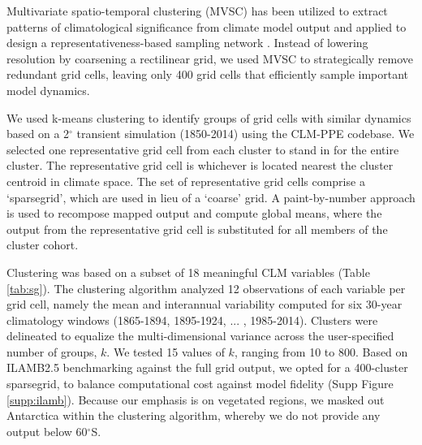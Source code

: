 \documentclass[draft]{agujournal2019}
\begin{document}
Multivariate spatio-temporal clustering (MVSC) has been utilized to extract patterns of climatological significance from climate model output \cite{hoffman2005} and applied to design a representativeness-based sampling network \cite{hoffman2013}. Instead of lowering resolution by coarsening a rectilinear grid, we used MVSC to strategically remove redundant grid cells, leaving only 400 grid cells that efficiently sample important model dynamics.

We used k-means clustering to identify groups of grid cells with similar dynamics based on a 2$^\circ$ transient simulation (1850-2014) using the CLM-PPE codebase. We selected one representative grid cell from each cluster to stand in for the entire cluster. The representative grid cell is whichever is located nearest the cluster centroid in climate space. The set of representative grid cells comprise a `sparsegrid', which are used in lieu of a `coarse' grid. A paint-by-number approach is used to recompose mapped output and compute global means, where the output from the representative grid cell is substituted for all members of the cluster cohort.

Clustering was based on a subset of 18 meaningful CLM variables (Table \ref{tab:sg}). The clustering algorithm analyzed 12 observations of each variable per grid cell, namely the mean and interannual variability computed for six 30-year climatology windows (1865-1894, 1895-1924, ... , 1985-2014). Clusters were delineated to equalize the multi-dimensional variance across the user-specified number of groups, $k$. We tested 15 values of $k$, ranging from 10 to 800. Based on ILAMB2.5 benchmarking \cite{collier2018} against the full grid output, we opted for a 400-cluster sparsegrid, to balance computational cost against model fidelity (Supp Figure \ref{supp:ilamb}). Because our emphasis is on vegetated regions, we masked out Antarctica within the clustering algorithm, whereby we do not provide any output below 60$^\circ$S.
\end{document}
